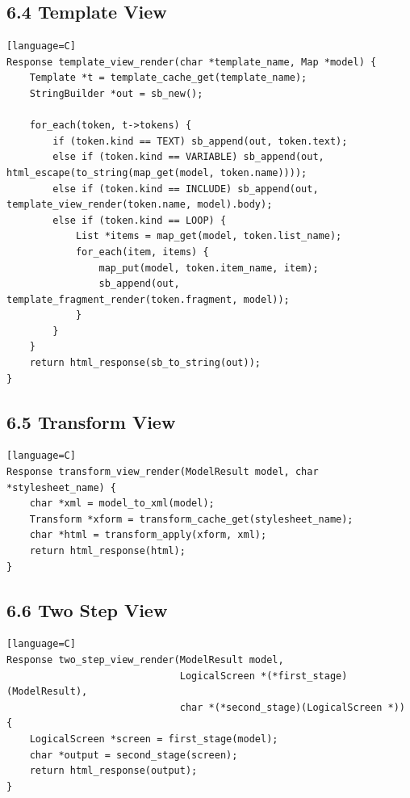 \documentclass[11pt]{article}
\begin{document}
\subsection{6.4 Template View}\label{template-view}

\begin{verbatim}[language=C]
Response template_view_render(char *template_name, Map *model) {
    Template *t = template_cache_get(template_name);
    StringBuilder *out = sb_new();

    for_each(token, t->tokens) {
        if (token.kind == TEXT) sb_append(out, token.text);
        else if (token.kind == VARIABLE) sb_append(out, html_escape(to_string(map_get(model, token.name))));
        else if (token.kind == INCLUDE) sb_append(out, template_view_render(token.name, model).body);
        else if (token.kind == LOOP) {
            List *items = map_get(model, token.list_name);
            for_each(item, items) {
                map_put(model, token.item_name, item);
                sb_append(out, template_fragment_render(token.fragment, model));
            }
        }
    }
    return html_response(sb_to_string(out));
}
\end{verbatim}

\subsection{6.5 Transform View}\label{transform-view}

\begin{verbatim}[language=C]
Response transform_view_render(ModelResult model, char *stylesheet_name) {
    char *xml = model_to_xml(model);
    Transform *xform = transform_cache_get(stylesheet_name);
    char *html = transform_apply(xform, xml);
    return html_response(html);
}
\end{verbatim}

\subsection{6.6 Two Step View}\label{two-step-view}

\begin{verbatim}[language=C]
Response two_step_view_render(ModelResult model,
                              LogicalScreen *(*first_stage)(ModelResult),
                              char *(*second_stage)(LogicalScreen *)) {
    LogicalScreen *screen = first_stage(model);
    char *output = second_stage(screen);
    return html_response(output);
}
\end{verbatim}
\end{document}
